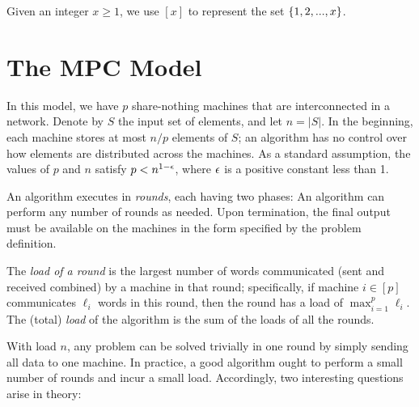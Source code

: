  Given an integer $x \ge 1$, we use $[x]$ to represent the set $\{1, 2, ..., x\}$.

\section{The MPC Model} \label{sec:model}

In this model, we have $p$ share-nothing machines that are interconnected in a network. Denote by $S$ the input set of elements, and let $n = |S|$. In the beginning, each machine stores at most $n/p$ elements of $S$; an algorithm has no control over how elements are distributed across the machines. As a standard assumption, the values of $p$ and $n$ satisfy $p < n^{1-\epsilon}$, where $\epsilon$ is a positive constant less than 1.


\vgap

An algorithm executes in {\em rounds}, each having two phases:
An algorithm can perform any number of rounds as needed. Upon termination, the final output must be available on the machines in the form specified by the problem definition.

\vgap

The {\em load of a round} is the largest number of words communicated (sent and received combined) by a machine in that round; specifically, if machine $i \in [p]$ communicates $\ell_i$ words in this round, then the round has a load of $\max_{i=1}^p \ell_i$. The (total) {\em load} of the algorithm is the sum of the loads of all the rounds.

\vgap

With load $n$, any problem can be solved trivially in one round by simply sending all data to one machine. In practice, a good algorithm ought to perform a small number of rounds and incur a small load. Accordingly, two interesting questions arise in theory:

